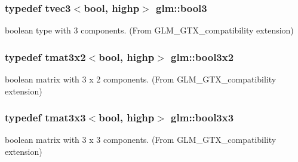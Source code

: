 \hypertarget{group__gtx__compatibility_gab7658aa2e0688b8ac7e640cf7e405c1e}{}
\subsubsection[{bool3}]{\setlength{\rightskip}{0pt plus 5cm}typedef tvec3$<$bool, highp$>$ {\bf glm\+::bool3}}\label{group__gtx__compatibility_gab7658aa2e0688b8ac7e640cf7e405c1e}


boolean type with 3 components. (From G\+L\+M\+\_\+\+G\+T\+X\+\_\+compatibility extension) 

\hypertarget{group__gtx__compatibility_ga6a944ad10139c8915bf72a832273ff02}{}
\subsubsection[{bool3x2}]{\setlength{\rightskip}{0pt plus 5cm}typedef tmat3x2$<$bool, highp$>$ {\bf glm\+::bool3x2}}\label{group__gtx__compatibility_ga6a944ad10139c8915bf72a832273ff02}


boolean matrix with 3 x 2 components. (From G\+L\+M\+\_\+\+G\+T\+X\+\_\+compatibility extension) 

\hypertarget{group__gtx__compatibility_ga5c0ded80422867674cd651ab2261f2a3}{}
\subsubsection[{bool3x3}]{\setlength{\rightskip}{0pt plus 5cm}typedef tmat3x3$<$bool, highp$>$ {\bf glm\+::bool3x3}}\label{group__gtx__compatibility_ga5c0ded80422867674cd651ab2261f2a3}


boolean matrix with 3 x 3 components. (From G\+L\+M\+\_\+\+G\+T\+X\+\_\+compatibility extension) 

\hypertarget{group__gtx__compatibility_gaf3777caf1e50112919be2939be05ae7e}{}
